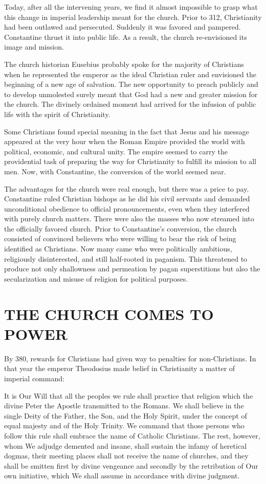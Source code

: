 Today, after all the intervening years, we find it almost impossible to grasp what this change in
imperial leadership meant for the church. Prior to 312, Christianity had been outlawed and
persecuted. Suddenly it was favored and pampered. Constantine thrust it into public life. As a
result, the church re-envisioned its image and mission.

The church historian Eusebius probably spoke for the majority of Christians when he represented the
emperor as the ideal Christian ruler and envisioned the beginning of a new age of salvation. The new
opportunity to preach publicly and to develop unmolested surely meant that God had a new and greater
mission for the church. The divinely ordained moment had arrived for the infusion of public life
with the spirit of Christianity.

Some Christians found special meaning in the fact that Jesus and his message appeared at the very
hour when the Roman Empire provided the world with political, economic, and cultural unity. The
empire seemed to carry the providential task of preparing the way for Christianity to fulfill its
mission to all men. Now, with Constantine, the conversion of the world seemed near.

The advantages for the church were real enough, but there was a price to pay. Constantine ruled
Christian bishops as he did his civil servants and demanded unconditional obedience to official
pronouncements, even when they interfered with purely church matters. There were also the masses who
now streamed into the officially favored church. Prior to Constantine’s conversion, the church
consisted of convinced believers who were willing to bear the risk of being identified as
Christians. Now many came who were politically ambitious, religiously disinterested, and still
half-rooted in paganism. This threatened to produce not only shallowness and permeation by pagan
superstitions but also the secularization and misuse of religion for political purposes.

\section{THE CHURCH COMES TO POWER}

By 380, rewards for Christians had given way to penalties for non-Christians. In that year the
emperor Theodosius made belief in Christianity a matter of imperial command:

\begin{blockquote}
It is Our Will that all the peoples we rule shall practice that religion which the divine Peter the
Apostle transmitted to the Romans. We shall believe in the single Deity of the Father, the Son, and
the Holy Spirit, under the concept of equal majesty and of the Holy Trinity. We command that those
persons who follow this rule shall embrace the name of Catholic Christians. The rest, however, whom
We adjudge demented and insane, shall sustain the infamy of heretical dogmas, their meeting places
shall not receive the name of churches, and they shall be smitten first by divine vengeance and
secondly by the retribution of Our own initiative, which We shall assume in accordance with divine
judgment.
\end{blockquote}

